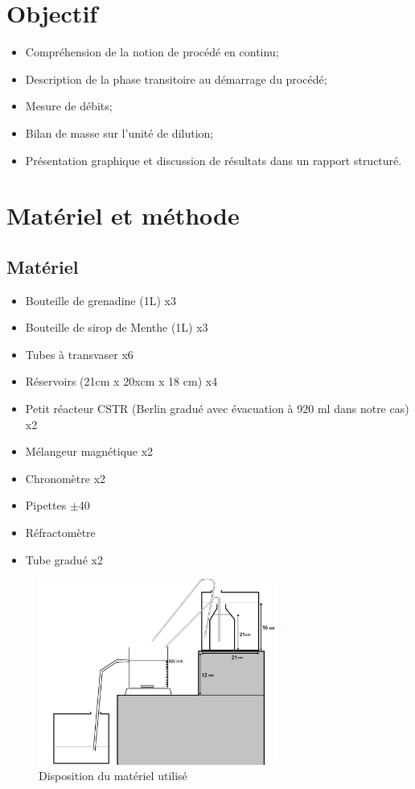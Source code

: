 \documentclass[a4paper,11pt]{article}
\begin{document}
\thispagestyle{empty}



\section{Objectif}
\begin{itemize}
	\item Compréhension de la notion de procédé en continu;
	\item Description de la phase transitoire au démarrage du procédé;
	\item Mesure de débits;
	\item Bilan de masse sur l'unité de dilution;
	\item Présentation graphique et discussion de résultats dans un rapport structuré.
\end{itemize}

\section{Matériel et méthode}
	\subsection{Matériel}
		\begin{itemize}
			\item Bouteille de grenadine (1L) x3
			\item Bouteille de sirop de Menthe (1L) x3
			\item Tubes à transvaser x6
			\item Réservoirs (21cm x 20xcm x 18 cm) x4
			\item Petit réacteur CSTR (Berlin gradué avec évacuation à 920 ml dans notre cas) x2
			\item Mélangeur magnétique x2
			\item Chronomètre x2
			\item Pipettes $\pm$40
			\item Réfractomètre
			\item Tube gradué x2	
		\end{itemize}
		\begin{figure}[h]
			\centering
			\includegraphics[width=0.7\textwidth]{pictures/materiel.png}
			\caption{Disposition du matériel utilisé}
		\end{figure}	
\end{document}
